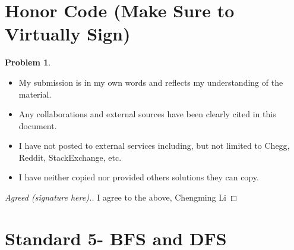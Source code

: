 \documentclass[11pt]{article}
\theoremstyle{definition}
\theoremstyle{definition}
\newtheorem{required}{Problem}
\theoremstyle{definition}
\begin{document}
\section{Honor Code (Make Sure to Virtually Sign)} \label{HonorCode}

\begin{required}
\begin{itemize}
\item My submission is in my own words and reflects my understanding of the material.
\item Any collaborations and external sources have been clearly cited in this document.
\item I have not posted to external services including, but not limited to Chegg, Reddit, StackExchange, etc.
\item I have neither copied nor provided others solutions they can copy.
\end{itemize}

\end{required}

\begin{proof}[Agreed (signature here).]
I agree to the above, Chengming Li
\end{proof}


\newpage
\section{Standard 5- BFS and DFS}
\end{document}
